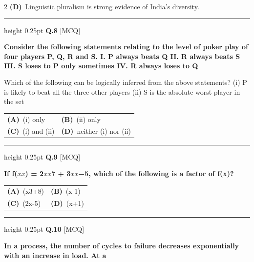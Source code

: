 \documentclass[a4paper,10pt,twoside]{article}
\begin{document}
\begin{multicols}{2}
\textbf{(D)}~Linguistic pluralism is strong evidence of India's diversity.
\par\vspace{6pt}\hrule height 0.25pt\vspace{6pt}
\noindent\textbf{Q.8} \hfill {\footnotesize\textsf{[MCQ]}}
\par\vspace{2pt}
{\bfseries Consider the following statements relating to the level of poker play of four players P, Q, R and S.
I.
P always beats Q
II.
R always beats S
III.
S loses to P only sometimes
IV.
R always loses to Q
\par\smallskip
Which of the following can be logically inferred from the above statements?
(i)
P is likely to beat all the three other players
(ii)
S is the absolute worst player in the set \par}
\par\vspace{2pt}\noindent
\begin{tabular*}{\columnwidth}{@{\extracolsep{\fill}}p{}p{}@{}}
\textbf{(A)}~(i) only & \textbf{(B)}~(ii) only \\
\addlinespace[2pt]
\textbf{(C)}~(i) and (ii) & \textbf{(D)}~neither (i) nor (ii)
\end{tabular*}
\par\vspace{6pt}\hrule height 0.25pt\vspace{6pt}
\noindent\textbf{Q.9} \hfill {\footnotesize\textsf{[MCQ]}}
\par\vspace{2pt}
{\bfseries If f($x$$x$) = 2$x$$x$7 + 3$x$$x$−5, which of the following is a factor of f(x)? \par}
\par\vspace{2pt}\noindent
\begin{tabular*}{\columnwidth}{@{\extracolsep{\fill}}p{}p{}@{}}
\textbf{(A)}~(x3+8) & \textbf{(B)}~(x-1) \\
\addlinespace[2pt]
\textbf{(C)}~(2x-5) & \textbf{(D)}~(x+1)
\end{tabular*}
\par\vspace{6pt}\hrule height 0.25pt\vspace{6pt}
\noindent\textbf{Q.10} \hfill {\footnotesize\textsf{[MCQ]}}
\par\vspace{2pt}
{\bfseries In a process, the number of cycles to failure decreases exponentially with an increase in load. At a
}
\end{multicols}
\end{document}
